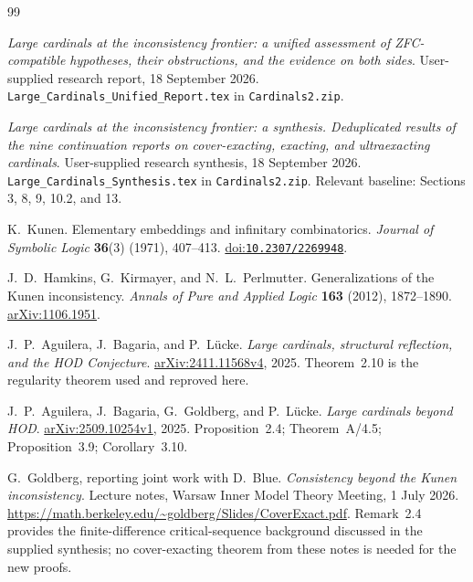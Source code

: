 \documentclass[11pt,letterpaper]{article}
\theoremstyle{definition}
\numberwithin{equation}{section}
\newcommand{\arxiv}[1]{\href{https://arxiv.org/abs/#1}{arXiv:#1}}
\newcommand{\doi}[1]{\href{https://doi.org/#1}{doi:\nolinkurl{#1}}}
\begin{document}
\clearpage
{}
{}
\begin{thebibliography}{99}
\small
\setlength{\itemsep}{6pt}

\emph{Large cardinals at the inconsistency frontier: a unified assessment of ZFC-compatible hypotheses, their obstructions, and the evidence on both sides}.
User-supplied research report, 18 September 2026.
\nolinkurl{Large_Cardinals_Unified_Report.tex} in \nolinkurl{Cardinals2.zip}.

\emph{Large cardinals at the inconsistency frontier: a synthesis. Deduplicated results of the nine continuation reports on cover-exacting, exacting, and ultraexacting cardinals}.
User-supplied research synthesis, 18 September 2026.
\nolinkurl{Large_Cardinals_Synthesis.tex} in \nolinkurl{Cardinals2.zip}.
Relevant baseline: Sections 3, 8, 9, 10.2, and 13.

K.~Kunen. Elementary embeddings and infinitary combinatorics.
\emph{Journal of Symbolic Logic} \textbf{36}(3) (1971), 407--413.
\doi{10.2307/2269948}.

J.~D.~Hamkins, G.~Kirmayer, and N.~L.~Perlmutter.
Generalizations of the Kunen inconsistency.
\emph{Annals of Pure and Applied Logic} \textbf{163} (2012), 1872--1890.
\arxiv{1106.1951}.

J.~P.~Aguilera, J.~Bagaria, and P.~L\"ucke.
\emph{Large cardinals, structural reflection, and the HOD Conjecture}.
\arxiv{2411.11568v4}, 2025.
Theorem~2.10 is the regularity theorem used and reproved here.

J.~P.~Aguilera, J.~Bagaria, G.~Goldberg, and P.~L\"ucke.
\emph{Large cardinals beyond HOD}.
\arxiv{2509.10254v1}, 2025.
Proposition~2.4; Theorem~A/4.5; Proposition~3.9; Corollary~3.10.

G.~Goldberg, reporting joint work with D.~Blue.
\emph{Consistency beyond the Kunen inconsistency}.
Lecture notes, Warsaw Inner Model Theory Meeting, 1 July 2026.
\url{https://math.berkeley.edu/~goldberg/Slides/CoverExact.pdf}.
Remark~2.4 provides the finite-difference critical-sequence background discussed in the supplied synthesis; no cover-exacting theorem from these notes is needed for the new proofs.

\end{thebibliography}
\end{document}
